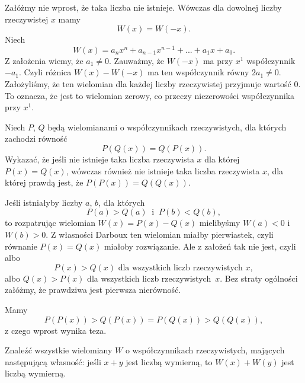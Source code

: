 \noindent
Załóżmy nie wprost, że taka liczba nie istnieje. Wówczas dla dowolnej liczby rzeczywistej $x$ mamy
\[
	W(x) = W(-x).
\]
Niech
\[
	W(x) = a_nx^n + a_{n - 1}x^{n - 1} + ... + a_1x + a_0.
\]
Z założenia wiemy, że $a_1 \neq 0$. Zauważmy, że $W(-x)$ ma przy $x^1$ współczynnik $-a_1$. Czyli różnica $W(x) - W(-x)$ ma ten współczynnik równy $2a_1 \neq 0$. Założyliśmy, że ten wielomian dla każdej liczby rzeczywistej przyjmuje wartość $0$. To oznacza, że jest to wielomian zerowy, co przeczy niezerowości współczynnika przy $x^1$.

\begin{problem}{4}
	Niech $P$, $Q$ będą wielomianami o współczynnikach rzeczywistych, dla których zachodzi równość 
	\[
		P(Q(x)) = Q(P(x)).
	\] 
	Wykazać, że jeśli nie istnieje taka liczba rzeczywista $x$ dla której $P(x) = Q(x)$, wówczas również nie istnieje taka liczba rzeczywista $x$, dla której prawdą jest, że $P(P(x)) = Q(Q(x))$.
\end{problem}

\noindent
Jeśli istniałyby liczby $a$, $b$, dla których 
\[
	P(a) > Q(a) \;\; \text{i} \;\; P(b) < Q(b),
\] 
to rozpatrując wielomian $W(x) = P(x) - Q(x)$ mielibyśmy $W(a) < 0$ i $W(b) > 0$. Z własności Darboux ten wielomian miałby pierwiastek, czyli równanie $P(x) = Q(x)$ miałoby rozwiązanie. Ale z założeń tak nie jest, czyli albo 
\[
	P(x) > Q(x) \text{ dla wszystkich liczb rzeczywistych } x,
\] 
albo $Q(x) > P(x)$ dla wszystkich liczb rzeczywistych~$x$. Bez straty ogólności załóżmy, że prawdziwa jest pierwsza nierówność.

\vspace{10px}
\noindent
Mamy 
\[
	P(P(x)) > Q(P(x)) = P(Q(x)) > Q(Q(x)),
\]
z czego wprost wynika teza.

\begin{problem}{5}
	Znaleźć wszystkie wielomiany $W$ o współczynnikach rzeczywistych, mających następującą własność:
	jeśli $x + y$ jest liczbą wymierną, to $W(x) + W(y)$ jest liczbą wymierną.
\end{problem}


